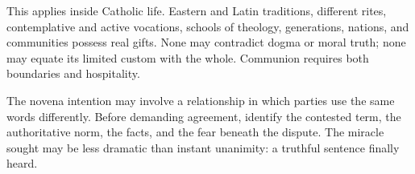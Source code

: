 This applies inside Catholic life. Eastern and Latin traditions, different rites, contemplative and active vocations, schools of theology, generations, nations, and communities possess real gifts. None may contradict dogma or moral truth; none may equate its limited custom with the whole. Communion requires both boundaries and hospitality.

The novena intention may involve a relationship in which parties use the same words differently. Before demanding agreement, identify the contested term, the authoritative norm, the facts, and the fear beneath the dispute. The miracle sought may be less dramatic than instant unanimity: a truthful sentence finally heard.




